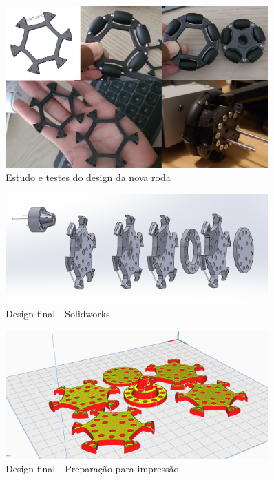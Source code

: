 \begin{figure}[h]
	\centering
	\caption{Estudo e testes do design da nova roda}
	\label{estudo_design}
	\includegraphics[width=0.9\textwidth]{figures/estudo_roda}
\end{figure}

\begin{figure}[h]
	\centering
	\caption{Design final - Solidworks}
	\label{design_solid}
	\includegraphics[width=0.9\textwidth]{figures/roda_processo_desing_passo2}
\end{figure}

\begin{figure}[h]
	\centering
	\caption{Design final - Preparação para impressão}
	\label{design_impressao}
	\includegraphics[width=0.9\textwidth]{figures/roda_processo_desing_passo3}
\end{figure}

